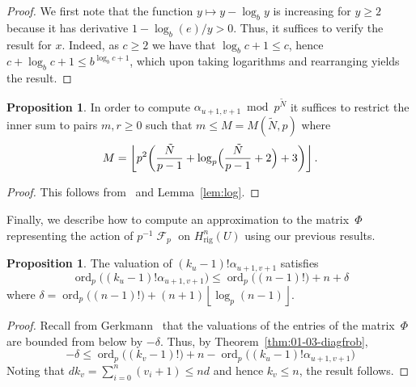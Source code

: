 \documentclass[a4paper,11pt]{article}
\numberwithin{equation}{section}
\providecommand{\floor}[1]{\left\lfloor#1\right\rfloor}   %
\DeclareMathOperator{\ord}{ord}          %
\DeclareMathOperator{\Frob}{\mathcal{F}} %
\providecommand{\Hrig}{H_{\text{rig}}}  %
\theoremstyle{definition}
\newtheorem{prop}[thm]{Proposition}
\begin{document}
\begin{proof}
We first note that the function $y \mapsto y - \log_b y$ is increasing 
for $y \geq 2$ because it has derivative $1 - \log_b(e)/y > 0$.  Thus, it 
suffices to verify the result for $x$.  Indeed, as $c \geq 2$ we have 
that $\log_b c + 1 \leq c$, hence $c + \log_b c + 1 \leq b^{\log_b c + 1}$,
which upon taking logarithms and rearranging yields the result.
\end{proof}

\begin{prop}
In order to compute $\alpha_{u+1,v+1} \bmod p^{\tilde{N}}$ it 
suffices to restrict the inner sum to pairs $m,r \geq 0$ such 
that $m \leq M = M(\tilde{N}, p)$ where 
\begin{equation}
M = \floor{ p^2 \biggl( \frac{\tilde{N}}{p-1} 
            + \log_p\Bigl(\frac{\tilde{N}}{p-1} + 2\Bigr) + 3 \biggr) }.
\end{equation}
\end{prop}

\begin{proof}
This follows from~\citep[\S 6.2]{Lauder2004b} and Lemma~\ref{lem:log}.
\end{proof}

Finally, we describe how to compute an approximation to the matrix~$\Phi$ 
representing the action of $p^{-1} \Frob_p$ on $\Hrig^{n}(U)$ using our 
previous results.

\begin{prop}
The valuation of $(k_u-1)! \alpha_{u+1,v+1}$ satisfies
\begin{equation}
\ord_p\bigl((k_u-1)! \alpha_{u+1,v+1}\bigr) 
    \leq \ord_p\bigl((n-1)!\bigr) + n + \delta
\end{equation}
where $\delta = \ord_p\bigl((n-1)!\bigr) + (n+1) \floor{\log_p(n-1)}$. 
\end{prop}

\begin{proof}
Recall from Gerkmann~\citep[Lemma~3.3]{Gerkmann2007} that the valuations 
of the entries of the matrix~$\Phi$ are bounded from below by $-\delta$. 
Thus, by Theorem~\ref{thm:01-03-diagfrob}, 
\begin{equation}
-\delta \leq \ord_p\bigl((k_v-1)!\bigr) + n 
           - \ord_p\bigl((k_u-1)! \alpha_{u+1,v+1}\bigr)
\end{equation}
Noting that $d k_v = \sum_{i=0}^n (v_i + 1) \leq n d$ and 
hence $k_v \leq n$, the result follows.
\end{proof}
\end{document}
